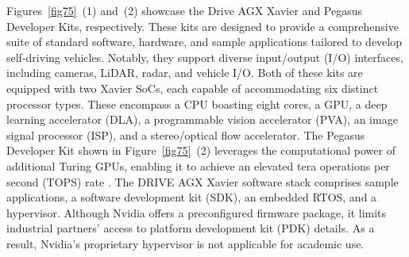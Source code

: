     Figures~\ref{fig75}~(1) and~(2) showcase the Drive AGX Xavier and Pegasus Developer Kits, respectively. These kits are designed to provide a comprehensive suite of standard software, hardware, and sample applications tailored to develop self-driving vehicles. Notably, they support diverse input/output (I/O) interfaces, including cameras, LiDAR, radar, and vehicle I/O.
    Both of these kits are equipped with two Xavier SoCs, each capable of accommodating six distinct processor types. These encompass a CPU boasting eight cores, a GPU, a deep learning accelerator (DLA), a programmable vision accelerator (PVA), an image signal processor (ISP), and a stereo/optical flow accelerator.
     The Pegasus Developer Kit shown in Figure~\ref{fig75}~(2) leverages the computational power of additional Turing GPUs, enabling it to achieve an elevated tera operations per second (TOPS) rate \cite{NVIDIA,9613692}.
   The DRIVE AGX Xavier software stack comprises sample applications, a software development kit (SDK), an embedded RTOS, and a hypervisor. Although Nvidia offers a preconfigured firmware package, it limits industrial partners' access to platform development kit (PDK) details. As a result, Nvidia's proprietary hypervisor is not applicable for academic use.





    
    


